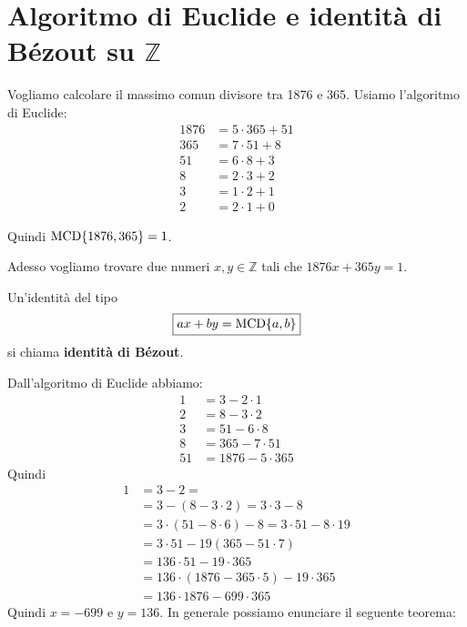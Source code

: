 \documentclass[../main.tex]{subfiles}
\begin{document}
\section{Algoritmo di Euclide e identità di Bézout su \texorpdfstring{$\mathbb{Z}$}{Z}}

Vogliamo calcolare il massimo comun divisore tra 1876 e 365. Usiamo l'algoritmo di Euclide:
\begin{align*}
    1876 & = 5 \cdot 365 + 51 \\
    365  & = 7 \cdot 51 + 8   \\
    51   & = 6 \cdot 8 + 3    \\
    8    & = 2 \cdot 3 + 2    \\
    3    & = 1 \cdot 2 + 1    \\
    2    & = 2 \cdot 1 + 0
\end{align*}

Quindi $\operatorname{MCD} \{1876,365\} = 1$.

Adesso vogliamo trovare due numeri $x,y \in \mathbb{Z} $ tali che $1876x + 365y = 1$.

\begin{definition}
    Un'identità del tipo
    \[
        \boxed{
            ax + by = \operatorname{MCD} \{a,b\}
        }
    \]
    si chiama \textbf{identità di Bézout}.
\end{definition}
Dall'algoritmo di Euclide abbiamo:
\begin{align*}
    1  & = 3 - 2 \cdot 1      \\
    2  & = 8 - 3 \cdot 2      \\
    3  & = 51 - 6 \cdot 8     \\
    8  & = 365 - 7 \cdot 51   \\
    51 & = 1876 - 5 \cdot 365
\end{align*}
Quindi
\begin{align*}
    1 & = 3 - 2 =                                                \\
      & = 3 - (8 - 3 \cdot 2) = 3 \cdot 3 - 8                    \\
      & = 3 \cdot (51 - 8 \cdot 6) - 8 = 3 \cdot 51 - 8 \cdot 19 \\
      & = 3 \cdot 51 - 19(365 - 51 \cdot 7)                      \\
      & = 136 \cdot 51 - 19 \cdot 365                            \\
      & = 136 \cdot (1876 - 365 \cdot 5) - 19 \cdot 365          \\
      & = 136 \cdot 1876 - 699 \cdot 365
\end{align*}
Quindi $x = -699$ e $y = 136$. In generale possiamo enunciare il seguente teorema:
\end{document}
